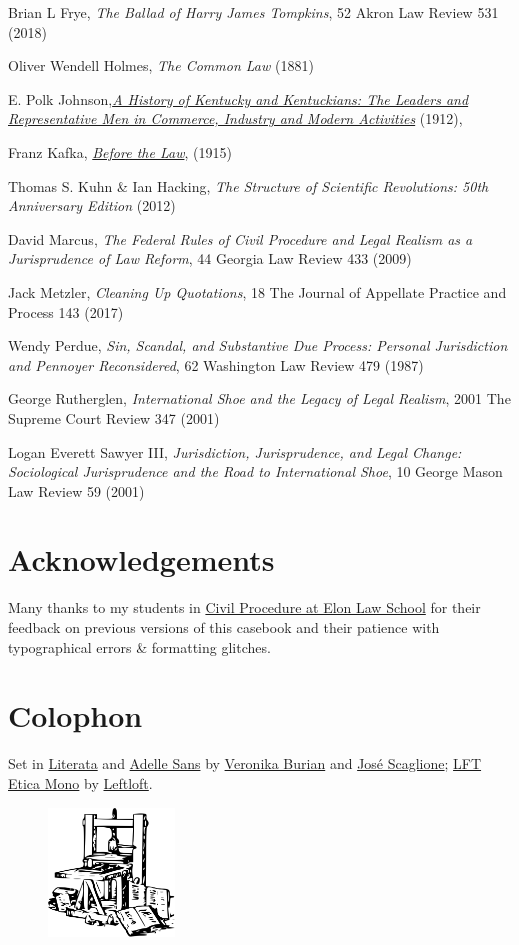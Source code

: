 Brian L Frye, \textit{The Ballad of Harry James Tompkins}, 52 Akron Law Review 531 (2018)

Oliver Wendell Holmes, \textit{The Common Law} (1881)

E. Polk Johnson,\href{https://play.google.com/books/reader?id=FXQUAAAAYAAJ\&pg=GBS.PA1144.w.2.1.0_421}{\textit{A History of Kentucky and Kentuckians: The Leaders and Representative Men in Commerce, Industry and Modern Activities}} (1912), 

Franz Kafka, \href{https://www.kafka-online.info/before-the-law.html}{\textit{Before the Law}}, (1915) 

Thomas S. Kuhn \& Ian Hacking, \textit{The Structure of Scientific Revolutions: 50th Anniversary Edition} (2012)

David Marcus, \textit{The Federal Rules of Civil Procedure and Legal Realism as a Jurisprudence of Law Reform}, 44 Georgia Law Review 433 (2009)

Jack Metzler, \textit{Cleaning Up Quotations}, 18 The Journal of Appellate Practice and Process 143 (2017)

Wendy Perdue, \textit{Sin, Scandal, and Substantive Due Process: Personal Jurisdiction and Pennoyer Reconsidered}, 62 Washington Law Review 479 (1987)

George Rutherglen, \textit{International Shoe and the Legacy of Legal Realism}, 2001 The Supreme Court Review 347 (2001)

Logan Everett Sawyer III, \textit{Jurisdiction, Jurisprudence, and Legal Change: Sociological Jurisprudence and the Road to International Shoe}, 10 George Mason Law Review 59 (2001)

\chapter*{Acknowledgements}

Many thanks to my students in \href{https://www.emfink.net/CivPro/}{Civil Procedure at Elon Law School} for their feedback on previous versions of this casebook and their patience with typographical errors \& formatting glitches. 

\chapter*{Colophon}

\raggedright{Set in \href{https://www.type-together.com/literata-font/}{Literata} and \href{https://www.type-together.com/adelle-sans-font/}{Adelle Sans} by \href{https://www.type-together.com/veronika-burian/}{Veronika Burian} and \href{https://www.type-together.com/jose-scaglione/}{José Scaglione}; \href{https://www.type-together.com/lft-etica-mono-font/}{LFT Etica Mono} by \href{https://www.type-together.com/leftloft/}{Leftloft}.}

\begin{figure}[h!]
\centering
\includegraphics[width=0.3\textwidth]{../img/gutenberg_press.png}
\end{figure}